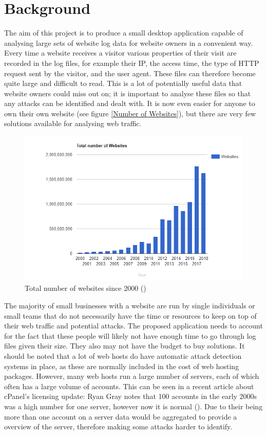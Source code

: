 
\section{Background}
The aim of this project is to produce a small desktop application capable of analysing large sets of website log data for website owners in a convenient way. Every time a website receives a visitor various properties of their visit are recorded in the log files, for example their IP, the access time, the type of HTTP request sent by the visitor, and the user agent. These files can therefore become quite large and difficult to read. This is a lot of potentially useful data that website owners could miss out on; it is important to analyse these files so that any attacks can be identified and dealt with. It is now even easier for anyone to own their own website (see figure \ref{Number of Websites}), but there are very few solutions available for analysing web traffic.

\begin{figure}[H] \label{Number of Websites} 
    \centering
    \includegraphics[width=\textwidth]{Images/numberOfWebsites.png}
    \caption{Total number of websites since 2000 (\cite{NumberofWebsites})}
    \label{Total number of websites since 2000}
\end{figure}
The majority of small businesses with a website are run by single individuals or small teams that do not necessarily have the time or resources to keep on top of their web traffic and potential attacks. The proposed application needs to account for the fact that these people will likely not have enough time to go through log files given their size. They also may not have the budget to buy solutions. It should be noted that a lot of web hosts do have automatic attack detection systems in place, as these are normally included in the cost of web hosting packages. However, many web hosts run a large number of servers, each of which often has a large volume of accounts. This can be seen in a recent article about cPanel's licensing update: Ryan Gray notes that 100 accounts in the early 2000s was a high number for one server, however now it is normal (\cite{cPanelArticle}). Due to their being more than one account on a server data would be aggregated to provide a overview of the server, therefore making some attacks harder to identify.

